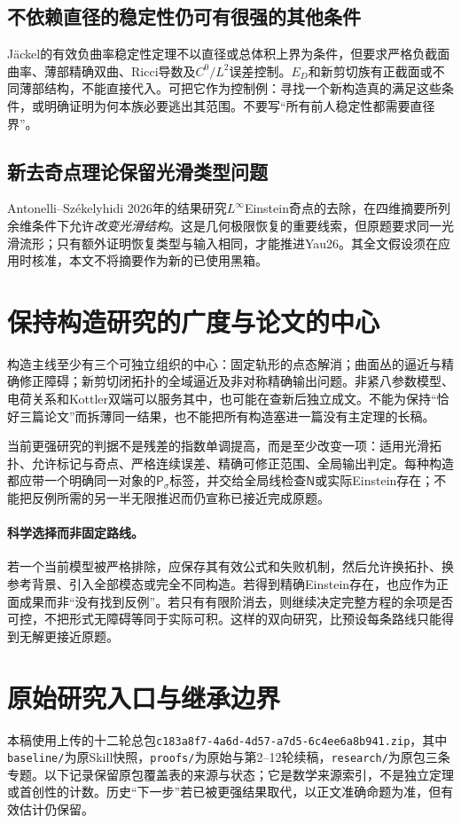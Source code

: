 \documentclass[UTF8,fontset=fandol,zihao=-4]{ctexart}
\theoremstyle{cn}
\begin{document}
\subsection{不依赖直径的稳定性仍可有很强的其他条件}
Jäckel的有效负曲率稳定性定理\cite{Jackel}不以直径或总体积上界为条件，但要求严格负截面曲率、薄部精确双曲、Ricci导数及$C^0/L^2$误差控制。$E_D$和新剪切族有正截面或不同薄部结构，不能直接代入。可把它作为控制例：寻找一个新构造真的满足这些条件，或明确证明为何本族必要逃出其范围。不要写“所有前人稳定性都需要直径界”。

\subsection{新去奇点理论保留光滑类型问题}
Antonelli--Székelyhidi 2026年的结果研究$L^\infty$Einstein奇点的去除，在四维摘要所列余维条件下允许\emph{改变光滑结构}\cite{AS}。这是几何极限恢复的重要线索，但原题要求同一光滑流形；只有额外证明恢复类型与输入相同，才能推进Yau26。其全文假设须在应用时核准，本文不将摘要作为新的已使用黑箱。

\section{保持构造研究的广度与论文的中心}
构造主线至少有三个可独立组织的中心：固定轨形的点态解消；曲面丛的逼近与精确修正障碍；新剪切闭拓扑的全域逼近及非对称精确输出问题。非紧八参数模型、电荷关系和Kottler双端可以服务其中，也可能在查新后独立成文。不能为保持“恰好三篇论文”而拆薄同一结果，也不能把所有构造塞进一篇没有主定理的长稿。

当前更强研究的判据不是残差的指数单调提高，而是至少改变一项：适用光滑拓扑、允许标记与奇点、严格连续误差、精确可修正范围、全局输出判定。每种构造都应带一个明确同一对象的$\mathsf P_\sigma$标签，并交给全局线检查$\mathsf N$或实际Einstein存在；不能把反例所需的另一半无限推迟而仍宣称已接近完成原题。

\paragraph{科学选择而非固定路线。}
若一个当前模型被严格排除，应保存其有效公式和失败机制，然后允许换拓扑、换参考背景、引入全部模态或完全不同构造。若得到精确Einstein存在，也应作为正面成果而非“没有找到反例”。若只有有限阶消去，则继续决定完整方程的余项是否可控，不把形式无障碍等同于实际可积。这样的双向研究，比预设每条路线只能得到无解更接近原题。
\appendix
\section{原始研究入口与继承边界}
本稿使用上传的十二轮总包\nolinkurl{c183a8f7-4a6d-4d57-a7d5-6c4ee6a8b941.zip}，其中\nolinkurl{baseline/}为原Skill快照，\nolinkurl{proofs/}为原始与第2--12轮续稿，\nolinkurl{research/}为原包三条专题。以下记录保留原包覆盖表的来源与状态；它是数学来源索引，不是独立定理或首创性的计数。历史“下一步”若已被更强结果取代，以正文准确命题为准，但有效估计仍保留。
\end{document}
